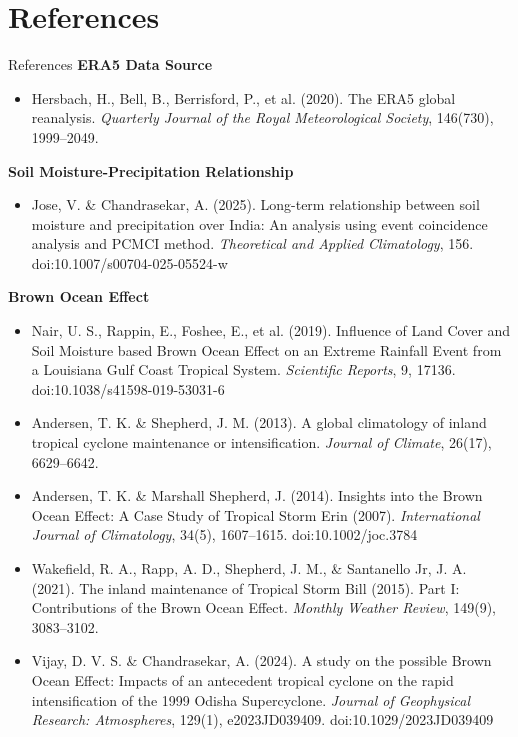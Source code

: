 \documentclass[10pt, aspectratio=169,t,xcolor=table]{beamer}
\begin{document}
\section{References}
\begin{frame}[allowframebreaks]{References}
	\textbf{ERA5 Data Source}
	\begin{itemize}\scriptsize
		\item Hersbach, H., Bell, B., Berrisford, P., et al. (2020). The ERA5 global reanalysis. \textit{Quarterly Journal of the Royal Meteorological Society}, 146(730), 1999–2049.
	\end{itemize}

	\textbf{Soil Moisture-Precipitation Relationship}
	\begin{itemize}\scriptsize
		\item Jose, V. \& Chandrasekar, A. (2025). Long-term relationship between soil moisture and precipitation over India: An analysis using event coincidence analysis and PCMCI method. \textit{Theoretical and Applied Climatology}, 156. doi:10.1007/s00704-025-05524-w
	\end{itemize}

	\textbf{Brown Ocean Effect}
	\begin{itemize}\scriptsize
		\item Nair, U. S., Rappin, E., Foshee, E., et al. (2019). Influence of Land Cover and Soil Moisture based Brown Ocean Effect on an Extreme Rainfall Event from a Louisiana Gulf Coast Tropical System. \textit{Scientific Reports}, 9, 17136. doi:10.1038/s41598-019-53031-6

		\item Andersen, T. K. \& Shepherd, J. M. (2013). A global climatology of inland tropical cyclone maintenance or intensification. \textit{Journal of Climate}, 26(17), 6629–6642.

		\item Andersen, T. K. \& Marshall Shepherd, J. (2014). Insights into the Brown Ocean Effect: A Case Study of Tropical Storm Erin (2007). \textit{International Journal of Climatology}, 34(5), 1607–1615. doi:10.1002/joc.3784

		\item Wakefield, R. A., Rapp, A. D., Shepherd, J. M., \& Santanello Jr, J. A. (2021). The inland maintenance of Tropical Storm Bill (2015). Part I: Contributions of the Brown Ocean Effect. \textit{Monthly Weather Review}, 149(9), 3083–3102.

		\item Vijay, D. V. S. \& Chandrasekar, A. (2024). A study on the possible Brown Ocean Effect: Impacts of an antecedent tropical cyclone on the rapid intensification of the 1999 Odisha Supercyclone. \textit{Journal of Geophysical Research: Atmospheres}, 129(1), e2023JD039409. doi:10.1029/2023JD039409
	\end{itemize}


\end{frame}
\end{document}
